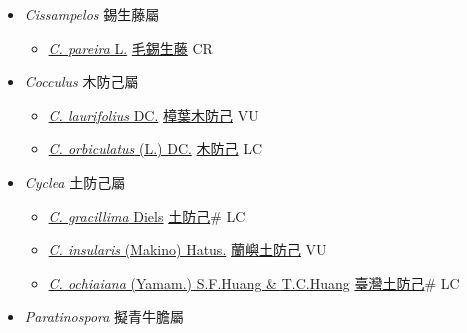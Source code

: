 
  \begin{itemize}
 \item[] \textit{Cissampelos} 錫生藤屬 
                    
  \begin{itemize}
        \item[] \href{http://www.theplantlist.org/tpl1.1/search?q=Cissampelos+pareira}{\textit{C. pareira} L.}   \href{\detokenize{http://taibnet.sinica.edu.tw/chi/taibnet_species_list.php?T2=毛錫生藤&T2_new_value=true&fr=y}}{毛錫生藤} CR
  \end{itemize}
 \item[] \textit{Cocculus} 木防己屬
                    
  \begin{itemize}
        \item[] \href{http://www.theplantlist.org/tpl1.1/search?q=Cocculus+laurifolius}{\textit{C. laurifolius} DC.}   \href{\detokenize{http://taibnet.sinica.edu.tw/chi/taibnet_species_list.php?T2=樟葉木防己&T2_new_value=true&fr=y}}{樟葉木防己} VU
        \item[] \href{http://www.theplantlist.org/tpl1.1/search?q=Cocculus+orbiculatus}{\textit{C. orbiculatus} (L.) DC.}   \href{\detokenize{http://taibnet.sinica.edu.tw/chi/taibnet_species_list.php?T2=木防己&T2_new_value=true&fr=y}}{木防己} LC
  \end{itemize}
 \item[] \textit{Cyclea} 土防己屬
                    
  \begin{itemize}
        \item[] \href{http://www.theplantlist.org/tpl1.1/search?q=Cyclea+gracillima}{\textit{C. gracillima} Diels}   \href{\detokenize{http://taibnet.sinica.edu.tw/chi/taibnet_species_list.php?T2=土防己&T2_new_value=true&fr=y}}{土防己}\# LC
        \item[] \href{http://www.theplantlist.org/tpl1.1/search?q=Cyclea+insularis}{\textit{C. insularis} (Makino) Hatus.}   \href{\detokenize{http://taibnet.sinica.edu.tw/chi/taibnet_species_list.php?T2=蘭嶼土防己&T2_new_value=true&fr=y}}{蘭嶼土防己} VU
        \item[] \href{http://www.theplantlist.org/tpl1.1/search?q=Cyclea+ochiaiana}{\textit{C. ochiaiana} (Yamam.) S.F.Huang \& T.C.Huang}   \href{\detokenize{http://taibnet.sinica.edu.tw/chi/taibnet_species_list.php?T2=臺灣土防己&T2_new_value=true&fr=y}}{臺灣土防己}\# LC
  \end{itemize}
 \item[] \textit{Paratinospora} 擬青牛膽屬
                    

\end{itemize}

